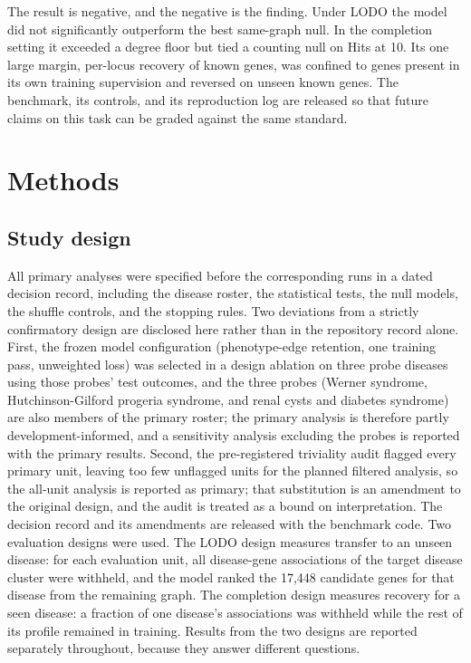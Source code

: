 \documentclass[11pt]{article}
\begin{document}
The result is negative, and the negative is the finding. Under LODO the model did not significantly outperform the best same-graph null. In the completion setting it exceeded a degree floor but tied a counting null on Hits at 10. Its one large margin, per-locus recovery of known genes, was confined to genes present in its own training supervision and reversed on unseen known genes. The benchmark, its controls, and its reproduction log are released so that future claims on this task can be graded against the same standard.

\section{Methods}

\subsection{Study design}

All primary analyses were specified before the corresponding runs in a dated decision record, including the disease roster, the statistical tests, the null models, the shuffle controls, and the stopping rules. Two deviations from a strictly confirmatory design are disclosed here rather than in the repository record alone. First, the frozen model configuration (phenotype-edge retention, one training pass, unweighted loss) was selected in a design ablation on three probe diseases using those probes' test outcomes, and the three probes (Werner syndrome, Hutchinson-Gilford progeria syndrome, and renal cysts and diabetes syndrome) are also members of the primary roster; the primary analysis is therefore partly development-informed, and a sensitivity analysis excluding the probes is reported with the primary results. Second, the pre-registered triviality audit flagged every primary unit, leaving too few unflagged units for the planned filtered analysis, so the all-unit analysis is reported as primary; that substitution is an amendment to the original design, and the audit is treated as a bound on interpretation. The decision record and its amendments are released with the benchmark code. Two evaluation designs were used. The LODO design measures transfer to an unseen disease: for each evaluation unit, all disease-gene associations of the target disease cluster were withheld, and the model ranked the 17,448 candidate genes for that disease from the remaining graph. The completion design measures recovery for a seen disease: a fraction of one disease's associations was withheld while the rest of its profile remained in training. Results from the two designs are reported separately throughout, because they answer different questions.
\end{document}
